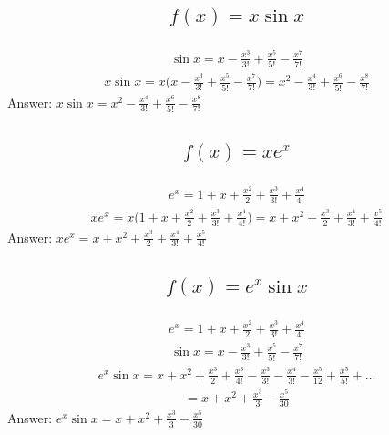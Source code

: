 \documentclass{article}
\begin{document}
\subsection{
	\begin{align*}
		f(x) = x\sin{x}
	\end{align*}
}
\begin{align*}
	\sin{x} = x - \frac{x^3}{3!} + \frac{x^5}{5!} - \frac{x^7}{7!}
\end{align*}
\begin{align*}
	x\sin{x} = x\bigg( x - \frac{x^3}{3!} + \frac{x^5}{5!} - \frac{x^7}{7!} \bigg) = x^2 - \frac{x^4}{3!} + \frac{x^6}{5!} - \frac{x^8}{7!}
\end{align*}
Answer: $x\sin{x} = x^2 - \frac{x^4}{3!} + \frac{x^6}{5!} - \frac{x^8}{7!}$


\subsection{
	\begin{align*}
		f(x) = xe^x
	\end{align*}
}
\begin{align*}
	e^x = 1 + x + \frac{x^2}{2} + \frac{x^3}{3!} + \frac{x^4}{4!}
\end{align*}
\begin{align*}
	xe^x = x \bigg( 1 + x + \frac{x^2}{2} + \frac{x^3}{3!} + \frac{x^4}{4!} \bigg) = x + x^2 + \frac{x^3}{2} + \frac{x^4}{3!} + \frac{x^5}{4!}
\end{align*}
Answer: $xe^x = x + x^2 + \frac{x^3}{2} + \frac{x^4}{3!} + \frac{x^5}{4!}$

\subsection{
	\begin{align*}
		f(x) = e^x \sin{x}
	\end{align*}
}
\begin{align*}
	e^x = 1 + x + \frac{x^2}{2} + \frac{x^3}{3!} + \frac{x^4}{4!}
\end{align*}
\begin{align*}
	\sin{x} = x - \frac{x^3}{3!} + \frac{x^5}{5!} - \frac{x^7}{7!}
\end{align*}
\begin{align*}
	e^x \sin{x} = x + x^2 + \frac{x^3}{2} + \frac{x^3}{4!} - \frac{x^3}{3!} - \frac{x^4}{3!} - \frac{x^5}{12} + \frac{x^5}{5!} + \dots
\end{align*}
\begin{align*}
	= x + x^2 + \frac{x^3}{3} - \frac{x^5}{30}
\end{align*}
Answer: $e^x \sin{x} = x + x^2 + \frac{x^3}{3} - \frac{x^5}{30}$
\end{document}
